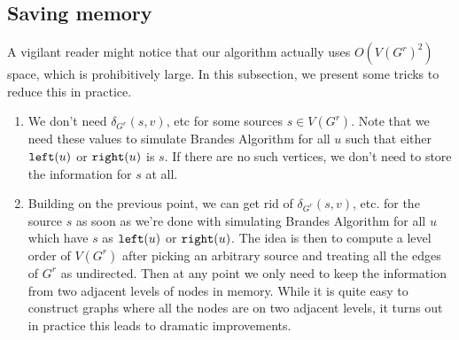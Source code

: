 \subsection{Saving memory}
A vigilant reader might notice that our algorithm actually uses
$O(V(G^r)^2)$ space, which is prohibitively large.
In this subsection, we present some tricks to reduce this in practice.

\begin{enumerate}[I]
\item
	We don't need $\delta_{G^r}(s, v)$, etc for some sources $s \in V(G^r)$.
	Note that we need these values to simulate Brandes Algorithm for all $u$
	such that either $\texttt{left}(u)$ or $\texttt{right}(u)$ is $s$.
	If there are no such vertices, we don't need to store the information
	for $s$ at all.
\item
	Building on the previous point, we can get rid of $\delta_{G^r}(s, v)$, etc.
	for the source $s$ as soon as we're done with simulating Brandes Algorithm
	for all $u$ which have $s$ as $\texttt{left}(u)$ or $\texttt{right}(u)$.
	The idea is then to compute a level order of $V(G^r)$ after picking an
	arbitrary source and treating all the edges of $G^r$ as undirected.
	Then at any point we only need to keep the information from two adjacent
	levels of nodes in memory.
	While it is quite easy to construct graphs where all the nodes are on two
	adjacent levels, it turns out in practice this leads to dramatic
	improvements.
\end{enumerate}
